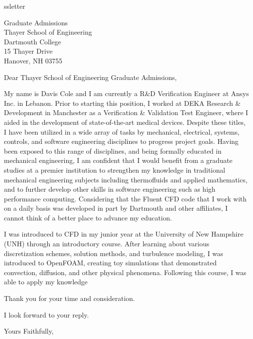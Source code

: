 ss{letter}
\usepackage[a4paper,left=2.5cm, right=2.5cm, top=2.5cm, bottom=2.5cm]{geometry}

\signature{Davis Cole}
\address{8 Reservoir Road\\ Lebanon, NH 03766 \\ (603) 727 6428 \\ davisrcole@gmail.com}


\begin{letter}{Graduate Admissions \\ Thayer School of Engineering \\ Dartmouth College \\ 15 Thayer Drive \\ Hanover, NH 03755}
\opening{Dear Thayer School of Engineering Graduate Admissions,}

My name is Davis Cole and I am currently a R\&D Verification Engineer at Ansys Inc. in Lebanon.
Prior to starting this position, I worked at DEKA Research \& Development in Manchester as a Verification \& Validation
Test Engineer, where I aided in the development of state-of-the-art medical devices. Despite these titles, 
I have been utilized in a wide array of tasks by mechanical, electrical, systems, controls, and software engineering disciplines 
to progress project goals. Having been exposed to this range of disciplines, and being formally educated in mechanical engineering, 
I am confident that I would benefit from a graduate studies at a premier institution to strengthen my knowledge in traditional
mechanical engineering subjects including thermofluids and applied mathematics, and to further develop other skills in software 
engineering such as high performance computing. Considering that the Fluent CFD code that I work with on a daily basis was 
developed in part by Dartmouth and other affiliates, I cannot think of a better place to advance my education.

I was introduced to CFD in my junior year at the University of New Hampshire (UNH) through an introductory course.
After learning about various discretization schemes, solution methods, and turbulence modeling, I was introduced to OpenFOAM, 
creating toy simulations that demonstrated convection, diffusion, and other physical phenomena. Following this course,
I was able to apply my knowledge

Thank you for your time and consideration.

I look forward to your reply.

\closing{Yours Faithfully,}



\end{letter}

